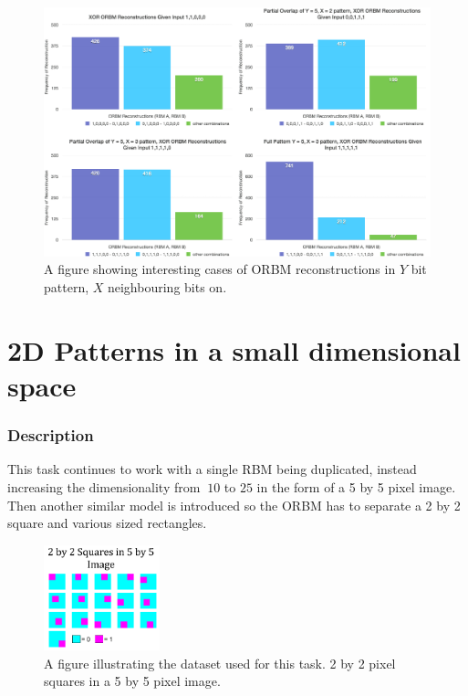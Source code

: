 \begin{landscape}
\begin{figure}
  \begin{center}
    \includegraphics[height=0.9\textheight]{Assets/results/xy-bit-results}
  \end{center}
  \caption{A figure showing interesting cases of ORBM reconstructions in $Y$ bit pattern, $X$ neighbouring bits on.}

  \label{F:X-Bit-ORBM-Inference-Results-1}
\end{figure}
\end{landscape}

\section{2D Patterns in a small dimensional space}%

\subsubsection{Description}
This task continues to work with a single RBM being duplicated, instead increasing the dimensionality from $~10$ to $25$ in the form of a 5 by 5 pixel image. Then another similar model is introduced so the ORBM has to separate a 2 by 2 square and various sized rectangles.

\begin{figure}[htb]
  \begin{center}
    \includegraphics[width=0.3\textwidth]{Assets/results/sq-dataset.png}
  \end{center}
  \caption{A figure illustrating the dataset used for this task. 2 by 2 pixel squares in a 5 by 5 pixel image.}
  \label{F:Sq-Dataset}
\end{figure}

